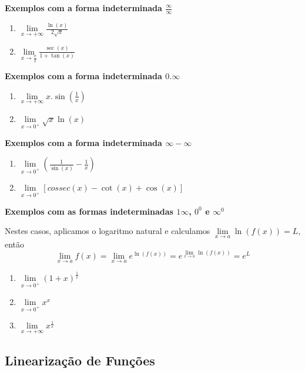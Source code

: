 \documentclass[oneside,a4paper,12pt]{article}
\begin{document}
{\bf Exemplos com a forma indeterminada $\frac{\infty}{\infty}$}
\begin{enumerate}
	\item $\lim\limits_{x \rightarrow + \infty}\frac{\ln(x)}{2\sqrt{x}}$
	\vspace{100pt}
	\item $\lim\limits_{x \rightarrow \frac{\pi}{2}}\frac{\sec(x)}{1+\tan(x)}$
	\vspace{100pt}
\end{enumerate}
{\bf Exemplos com a forma indeterminada $0.\infty$}
\begin{enumerate}
	\item $\lim\limits_{x \rightarrow + \infty}x.\sin(\frac{1}{x})$
	\vspace{200pt}
	\item $\lim\limits_{x \rightarrow 0^{+}}\sqrt{x}\ln(x)$
	\vspace{200pt}
\end{enumerate}
{\bf Exemplos com a forma indeterminada $\infty - \infty$}
\begin{enumerate}
	\item $\lim\limits_{x \rightarrow 0^{+}}\left( \frac{1}{\sin(x)} - \frac{1}{x} \right)$
	\vspace{300pt}
	\item $\lim\limits_{x \rightarrow 0^{+}}[cossec(x) - \cot(x) + \cos(x)]$
	\vspace{230pt}
\end{enumerate}
{\bf Exemplos com as formas indeterminadas $1{\infty}$, $0^0$ e $\infty^{0}$}

Nestes casos, aplicamos o logaritmo natural e calculamos $\lim\limits_{x \rightarrow a}\ln(f(x)) = L$, então 
$$\lim\limits_{x \rightarrow a}f(x) = \lim\limits_{x \rightarrow a}e^{\ln(f(x))} = e^{\lim\limits_{x \rightarrow a} \ln(f(x))} = e^L$$

\begin{enumerate}
	\item $\lim\limits_{x \rightarrow 0^{+}}(1+x)^{\frac{1}{x}}$
	\vspace{100pt}
	\item $\lim\limits_{x \rightarrow 0^{+}}x^x$
	\vspace{330pt}
	\item $\lim\limits_{x \rightarrow + \infty}x^{\frac{1}{x}}$
	\vspace{200pt}
\end{enumerate}

\subsection{Linearização de Funções}
\end{document}
